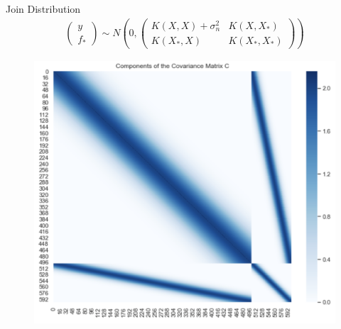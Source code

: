 \documentclass[10pt]{beamer}
\begin{document}
\begin{frame}{Join Distribution}
\begin{align*}
\left(
\begin{array}{c}
y \\
f_*
\end{array}
\right)
\sim
N\left(0, 
\left(
\begin{array}{cc}
K(X,X)+\sigma_n^2 & K(X,X_*) \\
K(X_*,X) & K(X_*,X_*)
\end{array}
\right)
\right)
\end{align*}
\begin{center}
\begin{figure}
\includegraphics[scale=0.25]{images/cov_prior_example2.png} 
\end{figure}
\end{center}
\end{frame}
\end{document}
